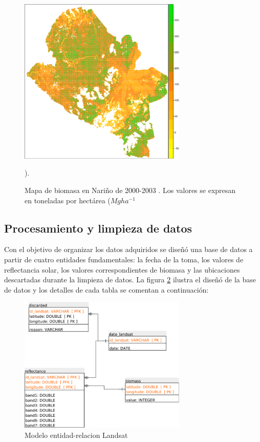\begin{figure}
  \centering
  \includegraphics[width = 8cm]{mapaNarino.pdf}
  \caption{Mapa de biomasa en Nariño de 2000-2003 \cite{baccini2008afirst}. Los valores se expresan en toneladas por hectárea ($Mg ha^{−1}$}).
  \label{fig:mapaNarino}
\end{figure}

\subsection{Procesamiento y limpieza de datos}

Con el objetivo de organizar los datos adquiridos se diseñó una base de datos a partir de cuatro entidades fundamentales: la fecha de la toma, los valores de reflectancia solar, los valores correspondientes de biomasa y las ubicaciones descartadas durante la limpieza de datos.  La figura \ref{fig:landsatET} ilustra el diseñó de la base de datos y los detalles de cada tabla se comentan a continuación:

\begin{figure}
  \centering
  \includegraphics[width = 8cm]{landsatET.pdf}
  \caption{Modelo entidad-relacion Landsat}
  \label{fig:landsatET}
\end{figure}

